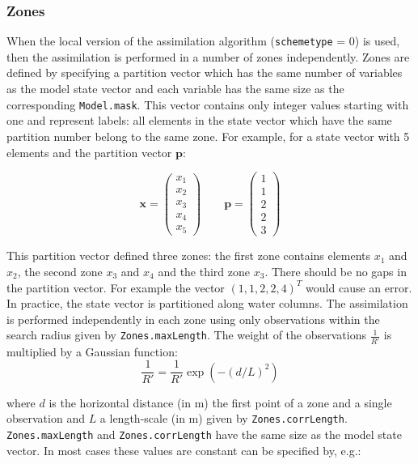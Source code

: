 \documentclass[a4paper,12pt]{article}
\newcommand{\code}{\texttt}
\begin{document}
\subsubsection{Zones}

When the local version of the assimilation algorithm (\code{schemetype} = 0) is used, then the assimilation is performed in a number of zones independently. Zones are defined by specifying a partition vector which has the same number of variables as the model state vector and each variable has the same size as the corresponding \code{Model.mask}. This vector contains only integer values starting with one and represent labels: all elements in the state vector which have the same partition number belong to the same zone. For example, for a state vector with 5 elements and the partition vector $\mathbf p$:

\begin{equation}
\mathbf x = 
\left( 
\begin{array}{c}
x_1 \\
x_2 \\
x_3 \\
x_4 \\
x_5
\end{array}
\right) 
\qquad
\mathbf p = 
\left( 
\begin{array}{c}
1 \\
1 \\
2 \\
2 \\
3
\end{array}
\right) 
\end{equation}

This partition vector defined three zones: the first zone contains elements $x_1$ and $x_2$, the second zone $x_3$ and $x_4$ and the third zone $x_3$. There should be no gaps in the partition vector. For example the vector $(1,1,2,2,4)^T$ would cause an error. 
In practice, the state vector is partitioned along water columns.
The assimilation is performed independently in each zone using only observations within the search radius given by 
\code{Zones.maxLength}. The weight of the observations $\frac{1}{R'}$ is multiplied by a Gaussian function:
\begin{equation}
\frac{1}{R'} = \frac{1}{R'} \exp(- (d/L)^2)
\end{equation}

where $d$ is the horizontal distance (in m) the first point of a zone and a single observation and $L$ a length-scale (in m) given by \code{Zones.corrLength}. \code{Zones.maxLength} and \code{Zones.corrLength} have the same size as the model state vector. In most cases these values are constant can be specified by, e.g.:
\end{document}
